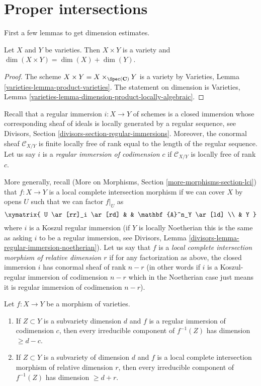 \section{Proper intersections}
\label{section-intersect-properly}

\noindent
First a few lemmas to get dimension estimates.

\begin{lemma}
\label{lemma-dimension-product-varieties}
Let $X$ and $Y$ be varieties. Then $X \times Y$ is a variety and
$\dim(X \times Y) = \dim(X) + \dim(Y)$.
\end{lemma}

\begin{proof}
The scheme $X \times Y = X \times_{\Spec(\mathbf{C})} Y$ is a variety by
Varieties, Lemma \ref{varieties-lemma-product-varieties}.
The statement on dimension is
Varieties, Lemma \ref{varieties-lemma-dimension-product-locally-algebraic}.
\end{proof}

\noindent
Recall that a regular immersion $i : X \to Y$ of schemes
is a closed immersion whose
corresponding sheaf of ideals is locally generated by a regular sequence, see
Divisors, Section \ref{divisors-section-regular-immersions}.
Moreover, the conormal sheaf $\mathcal{C}_{X/Y}$ is finite locally free of
rank equal to the length of the regular sequence. Let us say $i$ is a
{\it regular immersion of codimension $c$}
if $\mathcal{C}_{X/Y}$ is locally free of rank $c$.

\medskip\noindent
More generally, recall
(More on Morphisms, Section \ref{more-morphisms-section-lci})
that $f : X \to Y$ is a local complete intersection
morphism if we can cover $X$ by opens $U$ such that we can factor
$f|_U$ as
$$
\xymatrix{
U \ar[rr]_i \ar[rd] & & \mathbf{A}^n_Y \ar[ld] \\
& Y
}
$$
where $i$ is a Koszul regular immersion (if $Y$ is locally Noetherian
this is the same as asking $i$ to be a regular immersion, see
Divisors, Lemma \ref{divisors-lemma-regular-immersion-noetherian}).
Let us say that $f$ is a {\it local complete intersection morphism
of relative dimension $r$} if for any factorization as above, the
closed immersion $i$ has conormal sheaf of rank $n - r$ (in other
words if $i$ is a Koszul-regular immersion of codimension $n - r$
which in the Noetherian case just means it is regular immersion of
codimension $n - r$).

\begin{lemma}
\label{lemma-pullback-by-regular-immersion}
Let $f : X \to Y$ be a morphism of varieties.
\begin{enumerate}
\item If $Z \subset Y$ is a subvariety dimension $d$ and $f$ is a regular
immersion of codimension $c$, then every irreducible component
of $f^{-1}(Z)$ has dimension $\geq d - c$.
\item If $Z \subset Y$ is a subvariety of dimension $d$ and
$f$ is a local complete intersection morphism of relative dimension $r$,
then every irreducible component of $f^{-1}(Z)$ has dimension $\geq d + r$.
\end{enumerate}
\end{lemma}

